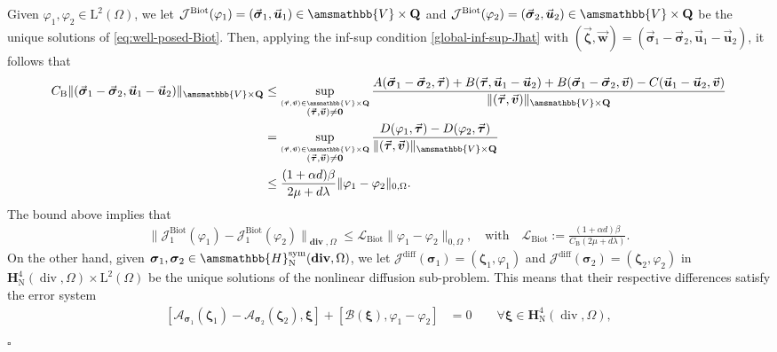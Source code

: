 \documentclass[fleqn,a4paper]{cas-sc}
\newcommand\vdiv{\mathop{\mathrm{div}}\nolimits}
\newcommand\bdiv{\mathop{\mathbf{div}}\nolimits}
\newcommand{\bu}{\boldsymbol{u}}
\newcommand{\bv}{\boldsymbol{v}}
\newcommand{\bw}{\boldsymbol{w}}
\newcommand{\bxi}{\boldsymbol{\xi}}
\newcommand{\bzeta}{\boldsymbol{\zeta}}
\newcommand{\0}{\boldsymbol{0}}
\newcommand\cA{\mathcal{A}}
\newcommand\cB{\mathcal{B}}
\newcommand\cJ{\mathcal{J}}
\newcommand\bQ{\mathbf{Q}}
\newcommand\bbV{\amsmathbb{V}}
\newcommand\bbH{\amsmathbb{H}}
\newcommand\bH{\mathbf{H}}
\newcommand\rL{\mathrm{L}}
\newcommand\bsigma{\boldsymbol{\sigma}}
\newcommand\btau{\boldsymbol{\tau}}
\numberwithin{equation}{section}
\numberwithin{figure}{section}
\newenvironment{proof}{\noindent{\it Proof.}}{\hfill$\square$}
\begin{document}
\begin{proof}
    Given $\varphi_{1}, \varphi_{2} \in \rL^2(\Omega)$, we let $\cJ^{\mathrm{Biot}}(\varphi_{1})=(\vec{\bsigma}_{1}, \vec{\bu}_{1}) \in \bbV\times \bQ$ and $\cJ^{\mathrm{Biot}}(\varphi_{2})=(\vec{\bsigma}_{2}, \vec{\bu}_{2}) \in \bbV\times \bQ$ be the unique solutions of \eqref{eq:well-posed-Biot}. Then, applying the inf-sup condition  \eqref{global-inf-sup-Jhat} with $(\vec{\bzeta}, \vec{\bw})=(\vec{\bsigma}_{1}-\vec{\bsigma}_{2},  \vec{\bu}_{1}- \vec{\bu}_{2})$, it follows that
    \begin{align*}%
     \displaystyle C_{\mathrm{B}}\|(\vec{\bsigma}_{1}-\vec{\bsigma}_{2},\vec{\bu}_{1}- \vec{\bu}_{2})\|_{\bbV\times \bQ} &\leq \sup_{\stackrel{(\vec{\btau},\vec{\bv}) \in \bbV\times \bQ}{ (\vec{\btau},\vec{\bv}) \neq \mathbf{0}}}\frac{A(\vec{\bsigma}_{1}-\vec{\bsigma}_{2},\vec{\btau})+B(\vec{\btau},\vec{\bu}_{1}- \vec{\bu}_{2})+ B(\vec{\bsigma}_{1}-\vec{\bsigma}_{2},\vec{\bv})-C(\vec{\bu}_{1}- \vec{\bu}_{2},\vec{\bv})}{\|(\vec{\btau},\vec{\bv})\|_{\bbV\times \bQ}}\\
     & = \sup_{\stackrel{(\vec{\btau},\vec{\bv}) \in \bbV\times \bQ}{ (\vec{\btau},\vec{\bv}) \neq \mathbf{0}}}\frac{D({\varphi}_{1},\vec{\btau})-D({\varphi}_{2},\vec{\btau})}{\|(\vec{\btau},\vec{\bv})\|_{\bbV\times \bQ}} \\
     & \leq \frac{(1+\alpha d)\beta}{2\mu + d\lambda}\|\varphi_{1}-\varphi_{2}\|_{0,\Omega}.
\end{align*}
The bound above implies that
\begin{align}\label{continuity-hat-biot}
\|\cJ_{1}^{\mathrm{Biot}}(\varphi_{1})-\cJ_{1}^{\mathrm{Biot}}(\varphi_{2})\|_{\bdiv, \Omega}
\leq  \mathcal{L}_{\mathrm{Biot}} \|\varphi_{1}-\varphi_{2}\|_{0,\Omega}, \quad \text{with} \quad \mathcal{L}_{\mathrm{Biot}} := \frac{(1+\alpha d)\beta}{C_{\mathrm{B}}(2\mu + d\lambda)}.
\end{align}
On the other hand, given ${\bsigma}_{1}, {\bsigma}_{2} \in \bbH^{\mathrm{sym}}_{\mathrm{N}}(\bdiv,\Omega)$, we let $\cJ^{\mathrm{diff}}({\bsigma}_{1})=(\bzeta_{1}, \varphi_{1})$ and $\cJ^{\mathrm{diff}}({\bsigma}_{2})=(\bzeta_{2}, \varphi_{2})$ in $\bH^{4}_{\mathrm{N}}(\vdiv,\Omega)\times \rL^2(\Omega)$ be the unique solutions of the nonlinear diffusion sub-problem. This means that their respective differences satisfy the error system
    \begin{subequations}\label{eq:diff_error_system}
    \begin{align}
        [\cA_{{\bsigma}_{1}}(\bzeta_{1}) - \cA_{{\bsigma}_{2}}(\bzeta_{2}), \bxi] + [\cB(\bxi), \varphi_{1}-\varphi_{2}] &= 0 \qquad \forall \bxi \in \bH_{\mathrm{N}}^4(\vdiv,\Omega), \label{eq:diff_error_1} \\

\end{align}
\end{subequations}
\end{proof}
\end{document}
